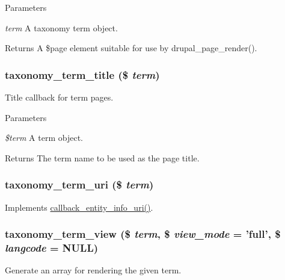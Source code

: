 \begin{DoxyParams}{Parameters}
\item[{\em term}]A taxonomy term object. \end{DoxyParams}
\begin{DoxyReturn}{Returns}
A \$page element suitable for use by drupal\_\-page\_\-render(). 
\end{DoxyReturn}
\hypertarget{taxonomy_8module_ac694b38220012b458a4beaa70a66abe3}{
\subsubsection[{taxonomy\_\-term\_\-title}]{\setlength{\rightskip}{0pt plus 5cm}taxonomy\_\-term\_\-title (\$ {\em term})}}
\label{taxonomy_8module_ac694b38220012b458a4beaa70a66abe3}
Title callback for term pages.


\begin{DoxyParams}{Parameters}
\item[{\em \$term}]A term object.\end{DoxyParams}
\begin{DoxyReturn}{Returns}
The term name to be used as the page title. 
\end{DoxyReturn}
\hypertarget{taxonomy_8module_a2d13c9b5d7e0c1d4b3b9b4f25cd6ebba}{
\subsubsection[{taxonomy\_\-term\_\-uri}]{\setlength{\rightskip}{0pt plus 5cm}taxonomy\_\-term\_\-uri (\$ {\em term})}}
\label{taxonomy_8module_a2d13c9b5d7e0c1d4b3b9b4f25cd6ebba}
Implements \hyperlink{group__callbacks_ga42bf4e69ee32b2bc99d0d774d4917254}{callback\_\-entity\_\-info\_\-uri()}. \hypertarget{taxonomy_8module_a852150709c30aa1f36a2f50ffc26cf7a}{
\subsubsection[{taxonomy\_\-term\_\-view}]{\setlength{\rightskip}{0pt plus 5cm}taxonomy\_\-term\_\-view (\$ {\em term}, \/  \$ {\em view\_\-mode} = {\ttfamily 'full'}, \/  \$ {\em langcode} = {\ttfamily NULL})}}
\label{taxonomy_8module_a852150709c30aa1f36a2f50ffc26cf7a}
Generate an array for rendering the given term.



